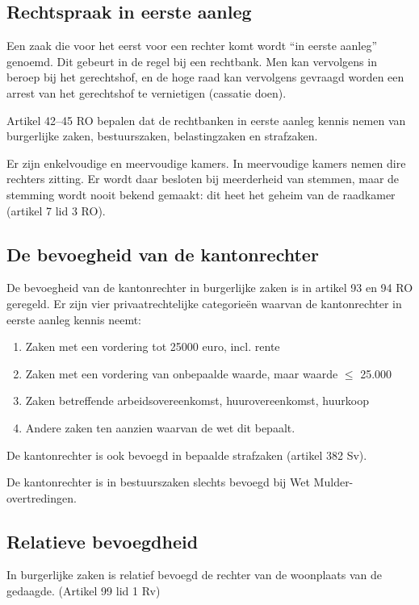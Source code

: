 \documentclass{article}
\begin{document}
\subsection{Rechtspraak in eerste aanleg}

Een zaak die voor het eerst voor een rechter komt wordt ``in eerste aanleg''
genoemd. Dit gebeurt in de regel bij een rechtbank. Men kan vervolgens in
beroep bij het gerechtshof, en de hoge raad kan vervolgens gevraagd worden een
arrest van het gerechtshof te vernietigen (cassatie doen).

Artikel 42--45 RO bepalen dat de rechtbanken in eerste aanleg kennis nemen van
burgerlijke zaken, bestuurszaken, belastingzaken en strafzaken.

Er zijn enkelvoudige en meervoudige kamers. In meervoudige kamers nemen dire
rechters zitting. Er wordt daar besloten bij meerderheid van stemmen, maar de
stemming wordt nooit bekend gemaakt: dit heet het geheim van de raadkamer
(artikel 7 lid 3 RO).

\subsection{De bevoegheid van de kantonrechter}

De bevoegheid van de kantonrechter in burgerlijke zaken is in artikel 93 en 94 RO
geregeld. Er zijn vier privaatrechtelijke categorieën waarvan de kantonrechter in eerste aanleg kennis
neemt:

\begin{enumerate}
  \item Zaken met een vordering tot 25000 euro, incl. rente
  \item Zaken met een vordering van onbepaalde waarde, maar waarde $\leq$ 25.000
  \item Zaken betreffende arbeidsovereenkomst, huurovereenkomst, huurkoop
  \item Andere zaken ten aanzien waarvan de wet dit bepaalt.
\end{enumerate}

De kantonrechter is ook bevoegd in bepaalde strafzaken (artikel 382 Sv).

De kantonrechter is in bestuurszaken slechts bevoegd bij Wet Mulder-overtredingen.

\subsection{Relatieve bevoegdheid}

In burgerlijke zaken is relatief bevoegd de rechter van de woonplaats van de
gedaagde. (Artikel 99 lid 1 Rv)
\end{document}
